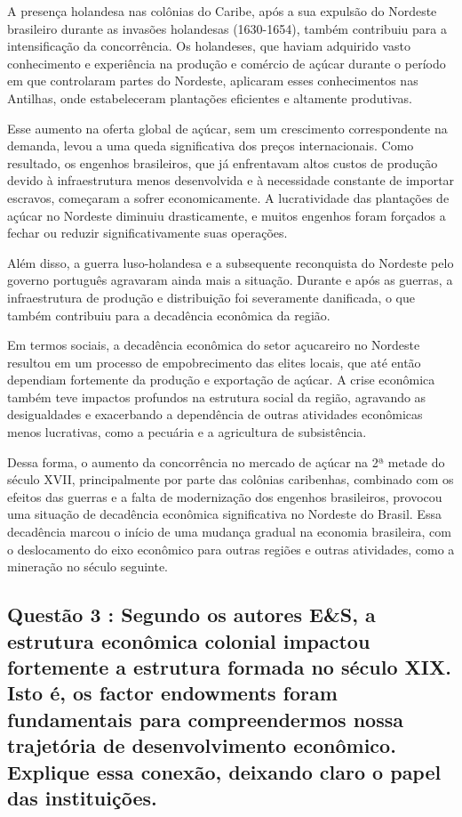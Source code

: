 \documentclass[a4paper,12pt]{article}[abntex2]
\begin{document}
A presença holandesa nas colônias do Caribe, após a sua expulsão do Nordeste brasileiro durante as invasões holandesas (1630-1654), também contribuiu para a intensificação da concorrência. Os holandeses, que haviam adquirido vasto conhecimento e experiência na produção e comércio de açúcar durante o período em que controlaram partes do Nordeste, aplicaram esses conhecimentos nas Antilhas, onde estabeleceram plantações eficientes e altamente produtivas.

Esse aumento na oferta global de açúcar, sem um crescimento correspondente na demanda, levou a uma queda significativa dos preços internacionais. Como resultado, os engenhos brasileiros, que já enfrentavam altos custos de produção devido à infraestrutura menos desenvolvida e à necessidade constante de importar escravos, começaram a sofrer economicamente. A lucratividade das plantações de açúcar no Nordeste diminuiu drasticamente, e muitos engenhos foram forçados a fechar ou reduzir significativamente suas operações.

Além disso, a guerra luso-holandesa e a subsequente reconquista do Nordeste pelo governo português agravaram ainda mais a situação. Durante e após as guerras, a infraestrutura de produção e distribuição foi severamente danificada, o que também contribuiu para a decadência econômica da região.

Em termos sociais, a decadência econômica do setor açucareiro no Nordeste resultou em um processo de empobrecimento das elites locais, que até então dependiam fortemente da produção e exportação de açúcar. A crise econômica também teve impactos profundos na estrutura social da região, agravando as desigualdades e exacerbando a dependência de outras atividades econômicas menos lucrativas, como a pecuária e a agricultura de subsistência.

Dessa forma, o aumento da concorrência no mercado de açúcar na 2ª metade do século XVII, principalmente por parte das colônias caribenhas, combinado com os efeitos das guerras e a falta de modernização dos engenhos brasileiros, provocou uma situação de decadência econômica significativa no Nordeste do Brasil. Essa decadência marcou o início de uma mudança gradual na economia brasileira, com o deslocamento do eixo econômico para outras regiões e outras atividades, como a mineração no século seguinte.

\subsection{\textbf{Questão 3 : Segundo os autores E\&S, a estrutura econômica colonial impactou fortemente a estrutura formada no século XIX. Isto é, os factor endowments foram fundamentais para compreendermos nossa trajetória de desenvolvimento econômico. Explique essa conexão, deixando claro o papel das instituições.}}
\end{document}
